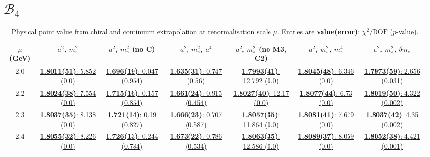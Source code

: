 \documentclass[12pt]{extarticle}
\begin{document}
\section{$\mathcal{B}_4$}
\begin{table}[h!]
\begin{center}
\begin{tabular}{|c|c|c|c|c|c|c|}
\hline
$\mu$ (GeV) & $a^2$, $m_\pi^2$& $a^2$, $m_\pi^2$ (no C)& $a^2$, $m_\pi^2$, $a^4$& $a^2$, $m_\pi^2$ (no M3, C2)& $a^2$, $m_\pi^2$, $m_\pi^4$& $a^2$, $m_\pi^2$, $\delta m_s$\\
\hline
2.0& \hyperlink{SSpPP/SUSY/bag_a2m2_20.pdf.1}{\textbf{1.8011(51)}: 5.852 (0.0)} & \hyperlink{SSpPP/SUSY/bag_a2m2noC_20.pdf.1}{\textbf{1.696(19)}: 0.047 (0.954)} & \hyperlink{SSpPP/SUSY/bag_a2a4m2_20.pdf.1}{\textbf{1.635(31)}: 0.747 (0.56)} & \hyperlink{SSpPP/SUSY/bag_a2m2mcut_20.pdf.1}{\textbf{1.7993(41)}: 12.792 (0.0)} & \hyperlink{SSpPP/SUSY/bag_a2m2m4_20.pdf.1}{\textbf{1.8045(48)}: 6.346 (0.0)} & \hyperlink{SSpPP/SUSY/bag_a2m2delm_20.pdf.1}{\textbf{1.7973(59)}: 2.656 (0.031)}\\
2.2& \hyperlink{SSpPP/SUSY/bag_a2m2_22.pdf.1}{\textbf{1.8024(38)}: 7.554 (0.0)} & \hyperlink{SSpPP/SUSY/bag_a2m2noC_22.pdf.1}{\textbf{1.715(16)}: 0.157 (0.854)} & \hyperlink{SSpPP/SUSY/bag_a2a4m2_22.pdf.1}{\textbf{1.661(24)}: 0.915 (0.454)} & \hyperlink{SSpPP/SUSY/bag_a2m2mcut_22.pdf.1}{\textbf{1.8027(40)}: 12.17 (0.0)} & \hyperlink{SSpPP/SUSY/bag_a2m2m4_22.pdf.1}{\textbf{1.8077(44)}: 6.73 (0.0)} & \hyperlink{SSpPP/SUSY/bag_a2m2delm_22.pdf.1}{\textbf{1.8019(50)}: 4.322 (0.002)}\\
2.3& \hyperlink{SSpPP/SUSY/bag_a2m2_23.pdf.1}{\textbf{1.8037(35)}: 8.138 (0.0)} & \hyperlink{SSpPP/SUSY/bag_a2m2noC_23.pdf.1}{\textbf{1.721(14)}: 0.19 (0.827)} & \hyperlink{SSpPP/SUSY/bag_a2a4m2_23.pdf.1}{\textbf{1.666(23)}: 0.707 (0.587)} & \hyperlink{SSpPP/SUSY/bag_a2m2mcut_23.pdf.1}{\textbf{1.8057(35)}: 11.864 (0.0)} & \hyperlink{SSpPP/SUSY/bag_a2m2m4_23.pdf.1}{\textbf{1.8081(41)}: 7.679 (0.0)} & \hyperlink{SSpPP/SUSY/bag_a2m2delm_23.pdf.1}{\textbf{1.8037(42)}: 4.35 (0.002)}\\
2.4& \hyperlink{SSpPP/SUSY/bag_a2m2_24.pdf.1}{\textbf{1.8055(32)}: 8.226 (0.0)} & \hyperlink{SSpPP/SUSY/bag_a2m2noC_24.pdf.1}{\textbf{1.726(13)}: 0.244 (0.784)} & \hyperlink{SSpPP/SUSY/bag_a2a4m2_24.pdf.1}{\textbf{1.673(22)}: 0.786 (0.534)} & \hyperlink{SSpPP/SUSY/bag_a2m2mcut_24.pdf.1}{\textbf{1.8063(35)}: 12.586 (0.0)} & \hyperlink{SSpPP/SUSY/bag_a2m2m4_24.pdf.1}{\textbf{1.8089(37)}: 8.059 (0.0)} & \hyperlink{SSpPP/SUSY/bag_a2m2delm_24.pdf.1}{\textbf{1.8052(38)}: 4.421 (0.001)}\\
\hline
\end{tabular}
\caption{Physical point value from chiral and continuum extrapolation at renormalisation scale $\mu$. Entries are \textbf{value(error)}: $\chi^2/\text{DOF}$ ($p$-value).}
\end{center}
\end{table}
\end{document}
